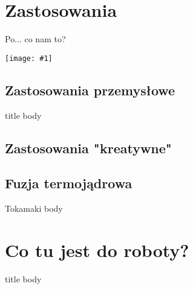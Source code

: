 \documentclass{beamer}
\newcommand {\framedgraphic}[1] {
        \begin{center}
            \texttt{[image: \#1]}
        \end{center}
}
\begin{document}
\section{Zastosowania}
\begin{frame}[t]{Po... co nam to?}
  \framedgraphic{img/nachujmilas.jpg}
\end{frame}


\subsection{Zastosowania przemysłowe}
\begin{frame}[t]{title}
  body
\end{frame}
\subsection{Zastosowania "kreatywne"}

\subsection{Fuzja termojądrowa}
\begin{frame}[t]{Tokamaki}
  body
\end{frame}



\section{Co tu jest do roboty?}
\begin{frame}[t]{title}
  body
\end{frame}
\end{document}
